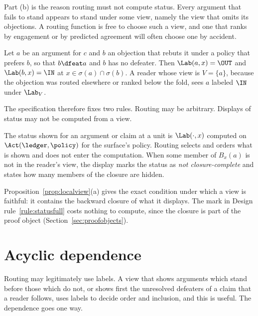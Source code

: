 Part (b) is the reason routing must not compute status. Every argument that fails to stand appears to stand under some view, namely the view that omits its objections. A routing function is free to choose such a view, and one that ranks by engagement or by predicted agreement will often choose one by accident.

\begin{counterexample}\label{cex:hidden}
Let $a$ be an argument for $c$ and $b$ an objection that rebuts it under a policy that prefers $b$, so that $b\dfeat a$ and $b$ has no defeater. Then $\Lab(a,x)=\OUT$ and $\Lab(b,x)=\IN$ at $x\in\sigma(a)\cap\sigma(b)$. A reader whose view is $V=\{a\}$, because the objection was routed elsewhere or ranked below the fold, sees $a$ labeled $\IN$ under $\Lab_V$.
\end{counterexample}

The specification therefore fixes two rules. Routing may be arbitrary. Displays of status may not be computed from a view.

\begin{designrule}\label{rule:statusfull}
The status shown for an argument or claim at a unit is $\Lab(\cdot,x)$ computed on $\Act(\ledger,\policy)$ for the surface's policy. Routing selects and orders what is shown and does not enter the computation. When some member of $B_x(a)$ is not in the reader's view, the display marks the status as \emph{not closure-complete} and states how many members of the closure are hidden.
\end{designrule}

Proposition~\ref{prop:localview}(a) gives the exact condition under which a view is faithful: it contains the backward closure of what it displays. The mark in Design rule~\ref{rule:statusfull} costs nothing to compute, since the closure is part of the proof object (Section~\ref{sec:proofobjects}).

\section{Acyclic dependence}\label{sec:acyclicdep}

Routing may legitimately use labels. A view that shows arguments which stand before those which do not, or shows first the unresolved defeaters of a claim that a reader follows, uses labels to decide order and inclusion, and this is useful. The dependence goes one way.


